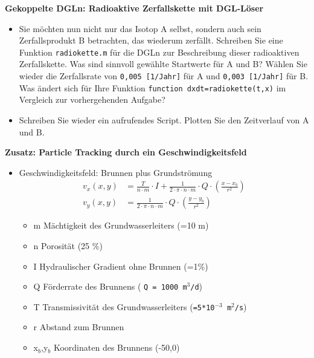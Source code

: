   \secMexercise
      \begin{frame}
          \frameMexercise
          \begin{exercise}
              \sloppy
              \textbf{Gekoppelte DGLn: Radioaktive Zerfallskette mit DGL-Löser}
              \begin{itemize}
                \item Sie möchten nun nicht nur das Isotop A selbst, sondern auch sein Zerfallsprodukt B betrachten, das wiederum zerfällt. Schreiben Sie eine Funktion \texttt{radiokette.m} für die DGLn zur Beschreibung dieser radioaktiven Zerfallskette. Was sind sinnvoll gewählte Startwerte für A und B? Wählen Sie wieder die Zerfallsrate von \texttt{0,005  [1/Jahr]} für A und \texttt{0,003  [1/Jahr]} für B. Was ändert sich für Ihre Funktion \texttt{function dxdt=radiokette(t,x)} im Vergleich zur vorhergehenden Aufgabe?
                \item Schreiben Sie wieder ein aufrufendes Script. Plotten Sie den Zeitverlauf von A und B.
              \end{itemize}
          \end{exercise}
      \end{frame}

  \secMexercise
      \begin{frame}
          \frameMexercise
          \begin{exercise}
              \sloppy
              \textbf{Zusatz: Particle Tracking durch ein Geschwindigkeitsfeld}
              \begin{itemize}
               \item Geschwindigkeitsfeld: Brunnen plus Grundströmung
                 \begin{align*}
                     v_{x}(x,y) &= \frac{T}{n \cdot m} \cdot I+\frac{1}{2 \cdot \pi \cdot n \cdot m} \cdot Q \cdot \left( \frac{x-x_{b}}{r^{2}} \right) \\
         		     v_{y}(x,y) &= \frac{1}{2 \cdot \pi \cdot n \cdot m} \cdot Q \cdot \left( \frac{y-y_{b}}{r^{2}} \right)
         		 \end{align*}

                  \begin{itemize}
					\item m	Mächtigkeit des Grundwasserleiters (=10 m)
					\item n	Porosität (25 \%)
					\item I	Hydraulischer Gradient ohne Brunnen (=1\%)
					\item Q	Förderrate des Brunnens ( \texttt{Q = 1000 m$^3$/d})
					\item T	Transmissivität des Grundwasserleiters (\texttt{=5*10$^{-3}$ m$^2$/s})
					\item r	Abstand zum Brunnen
					\item x$_b$,y$_b$ Koordinaten des Brunnens (-50,0)
				  \end{itemize}

                \end{itemize}
          \end{exercise}
      \end{frame}

